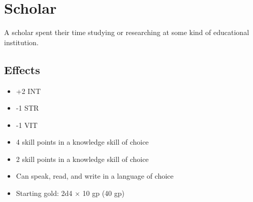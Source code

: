 \section{Scholar}\label{background:scholar}
A scholar spent their time studying or researching at some kind of educational
institution.

\subsection*{Effects}
\begin{itemize}
    \item +2 INT
    \item -1 STR
    \item -1 VIT
    \item 4 skill points in a knowledge skill of choice
    \item 2 skill points in a knowledge skill of choice
    \item Can speak, read, and write in a language of choice
    \item Starting gold: 2d4 $\times$ 10 gp (40 gp)
\end{itemize}
